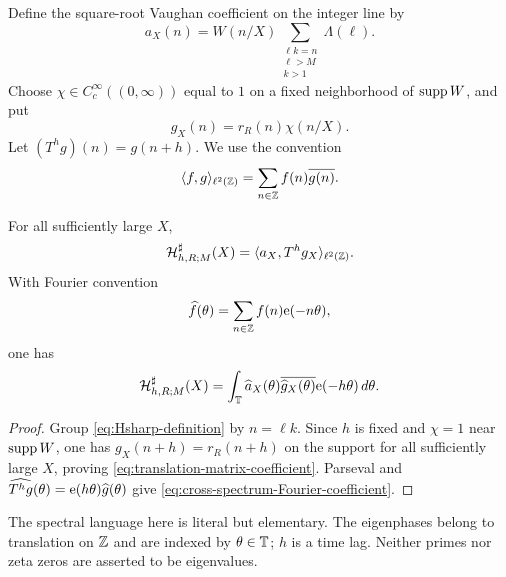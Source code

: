 Define the square-root Vaughan coefficient on the integer line by
\begin{equation}
 a_X(n)=W(n/X)
 \sum_{\substack{\ell k=n\\\ell>M\\k>1}}\Lambda(\ell).
 \label{eq:square-root-Vaughan-coefficient}
\end{equation}
Choose $\chi\in C_c^\infty((0,\infty))$ equal to $1$ on a fixed
neighborhood of $\operatorname{supp} W$, and put
\begin{equation}
 g_X(n)=r_R(n)\chi(n/X).
 \label{eq:localized-residual}
\end{equation}
Let $(T^hg)(n)=g(n+h)$.
We use the convention
\begin{equation}
 \langle f,g\rangle_{\ell^2(\mathbb Z)}
 =\sum_{n\in\mathbb Z}f(n)\overline{g(n)}.
 \label{eq:inner-product-convention}
\end{equation}

\begin{proposition}
\label{prop:translation-cross-spectrum}
For all sufficiently large $X$,
\begin{equation}
 \mathcal H^\sharp_{h,R;M}(X)=
 \langle a_X,T^hg_X\rangle_{\ell^2(\mathbb Z)}.
 \label{eq:translation-matrix-coefficient}
\end{equation}
With Fourier convention
\begin{equation}
 \widehat f(\theta)=\sum_{n\in\mathbb Z}f(n)\mathrm e(-n\theta),
 \label{eq:Fourier-convention}
\end{equation}
one has
\begin{equation}
 \mathcal H^\sharp_{h,R;M}(X)=
 \int_\mathbb T\widehat a_X(\theta)
 \overline{\widehat g_X(\theta)}
 \mathrm e(-h\theta)\,d\theta.
 \label{eq:cross-spectrum-Fourier-coefficient}
\end{equation}
\end{proposition}

\begin{proof}
Group \eqref{eq:Hsharp-definition} by $n=\ell k$.  Since $h$ is fixed
and $\chi=1$ near $\operatorname{supp} W$, one has $g_X(n+h)=r_R(n+h)$ on the support
for all sufficiently large $X$, proving
\eqref{eq:translation-matrix-coefficient}.  Parseval and
$\widehat{T^hg}(\theta)=\mathrm e(h\theta)\widehat g(\theta)$ give
\eqref{eq:cross-spectrum-Fourier-coefficient}.
\end{proof}

The spectral language here is literal but elementary.  The eigenphases
belong to translation on $\mathbb Z$ and are indexed by $\theta\in\mathbb T$; $h$ is a
time lag.  Neither primes nor zeta zeros are asserted to be eigenvalues.

